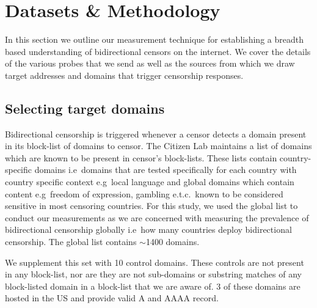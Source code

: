 \section{Datasets \& Methodology}\label{sec:methodology}

In this section we outline our measurement technique for establishing a breadth
based understanding of bidirectional censors on the internet. We cover the
details of the various probes that we send as well as the sources from which we
draw target addresses and domains that trigger censorship responses.

\subsection{Selecting target domains}
\label{sec:methodology:domains}
Bidirectional censorship is triggered whenever a censor detects a domain present 
in its block-list of domains to censor. The Citizen Lab \cite{TheCitiz6:online}
maintains a list of domains \cite{testlist} which are known to be present 
in censor's block-lists. These lists contain country-specific domains i.e\ domains that are tested specifically for each country with country specific context e.g\ local language and global domains which contain content e.g\ freedom of expression, gambling e.t.c.\ known to be considered sensitive in most censoring countries. For this study, we used the global list to conduct our measurements as we are concerned with measuring the prevalence of bidirectional censorship globally i.e\ how many countries deploy bidirectional censorship. The global list contains $\sim$1400 domains.

We supplement this set with 10 control domains. These controls are not present in any
block-list, nor are they are not sub-domains or substring matches of any block-listed domain in a block-list that we are aware of. 3 of these domains are hosted in the US and provide valid A and AAAA record.

